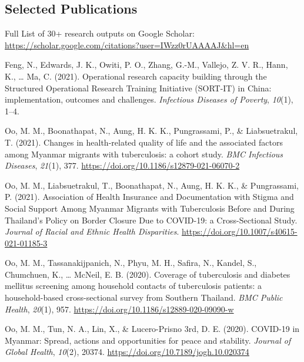 \documentclass[11pt,a4paper,]{awesome-cv}
\begin{document}
\hypertarget{selected-publications}{%
\subsection{Selected Publications}\label{selected-publications}}

\begin{center}
Full List of 30+ research outputs on Google Scholar:
\url{https://scholar.google.com/citations?user=IWzz0rUAAAAJ\&hl=en}

\end{center}

\hypertarget{refs_selected}{}
\leavevmode{}%
Feng, N., Edwards, J. K., Owiti, P. O., Zhang, G.-M., Vallejo, Z. V. R.,
Hann, K., \ldots{} Ma, C. (2021). {Operational research capacity
building through the Structured Operational Research Training Initiative
(SORT-IT) in China: implementation, outcomes and challenges}.
\emph{Infectious Diseases of Poverty}, \emph{10}(1), 1--4.

\leavevmode{}%
Oo, M. M., Boonathapat, N., Aung, H. K. K., Pungrassami, P., \&
Liabsuetrakul, T. (2021). {Changes in health-related quality of life and
the associated factors among Myanmar migrants with tuberculosis: a
cohort study}. \emph{BMC Infectious Diseases}, \emph{21}(1), 377.
\url{https://doi.org/10.1186/s12879-021-06070-2}

\leavevmode{}%
Oo, M. M., Liabsuetrakul, T., Boonathapat, N., Aung, H. K. K., \&
Pungrassami, P. (2021). {Association of Health Insurance and
Documentation with Stigma and Social Support Among Myanmar Migrants with
Tuberculosis Before and During Thailand's Policy on Border Closure Due
to COVID-19: a Cross-Sectional Study}. \emph{Journal of Racial and
Ethnic Health Disparities}.
\url{https://doi.org/10.1007/s40615-021-01185-3}

\leavevmode{}%
Oo, M. M., Tassanakijpanich, N., Phyu, M. H., Safira, N., Kandel, S.,
Chumchuen, K., \ldots{} McNeil, E. B. (2020). {Coverage of tuberculosis
and diabetes mellitus screening among household contacts of tuberculosis
patients: a household-based cross-sectional survey from Southern
Thailand}. \emph{BMC Public Health}, \emph{20}(1), 957.
\url{https://doi.org/10.1186/s12889-020-09090-w}

\leavevmode{}%
Oo, M. M., Tun, N. A., Lin, X., \& Lucero-Prisno 3rd, D. E. (2020).
{COVID-19 in Myanmar: Spread, actions and opportunities for peace and
stability}. \emph{Journal of Global Health}, \emph{10}(2), 20374.
\url{https://doi.org/10.7189/jogh.10.020374}
\end{document}
